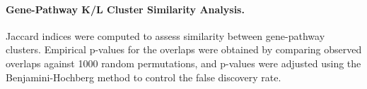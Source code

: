 \paragraph{Gene-Pathway K/L Cluster Similarity Analysis.}
Jaccard indices were computed to assess similarity between gene-pathway clusters. Empirical p-values for the overlaps were obtained by comparing observed overlaps against 1000 random permutations, and p-values were adjusted using the Benjamini-Hochberg method to control the false discovery rate.